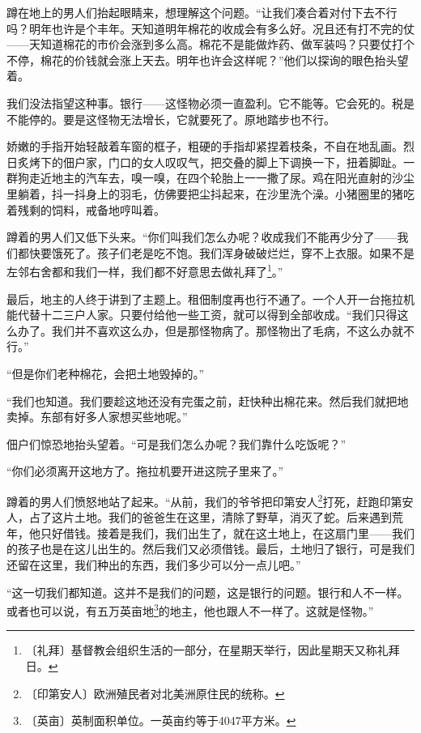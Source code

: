 \documentclass[12pt,UTF-8,openany]{ctexbook}
\begin{document}
\begin{normalsize}
    蹲在地上的男人们抬起眼睛来，想理解这个问题。“让我们凑合着对付下去不行吗？明年也许是个丰年。天知道明年棉花的收成会有多么好。况且还有打不完的仗——天知道棉花的市价会涨到多么高。棉花不是能做炸药、做军装吗？只要仗打个不停，棉花的价钱就会涨上天去。明年也许会这样呢？”他们以探询的眼色抬头望着。
    
    我们没法指望这种事。银行——这怪物必须一直盈利。它不能等。它会死的。税是不能停的。要是这怪物无法增长，它就要死了。原地踏步也不行。
    
    娇嫩的手指开始轻敲着车窗的框子，粗硬的手指却紧捏着枝条，不自在地乱画。烈日炙烤下的佃户家，门口的女人叹叹气，把交叠的脚上下调换一下，扭着脚趾。一群狗走近地主的汽车去，嗅一嗅，在四个轮胎上一一撒了尿。鸡在阳光直射的沙尘里躺着，抖一抖身上的羽毛，仿佛要把尘抖起来，在沙里洗个澡。小猪圈里的猪吃着残剩的饲料，戒备地哼叫着。
    
    蹲着的男人们又低下头来。“你们叫我们怎么办呢？收成我们不能再少分了——我们都快要饿死了。孩子们老是吃不饱。我们浑身破破烂烂，穿不上衣服。如果不是左邻右舍都和我们一样，我们都不好意思去做礼拜了\footnote{〔礼拜〕基督教会组织生活的一部分，在星期天举行，因此星期天又称礼拜日。}。”
    
    最后，地主的人终于讲到了主题上。租佃制度再也行不通了。一个人开一台拖拉机能代替十二三户人家。只要付给他一些工资，就可以得到全部收成。“我们只得这么办了。我们并不喜欢这么办，但是那怪物病了。那怪物出了毛病，不这么办就不行。”
    
    “但是你们老种棉花，会把土地毁掉的。”
    
    “我们也知道。我们要趁这地还没有完蛋之前，赶快种出棉花来。然后我们就把地卖掉。东部有好多人家想买些地呢。”
    
    佃户们惊恐地抬头望着。“可是我们怎么办呢？我们靠什么吃饭呢？”
    
    “你们必须离开这地方了。拖拉机要开进这院子里来了。”
    
    蹲着的男人们愤怒地站了起来。“从前，我们的爷爷把印第安人\footnote{〔印第安人〕欧洲殖民者对北美洲原住民的统称。}打死，赶跑印第安人，占了这片土地。我们的爸爸生在这里，清除了野草，消灭了蛇。后来遇到荒年，他只好借钱。接着是我们，我们出生了，就在这土地上，在这扇门里——我们的孩子也是在这儿出生的。然后我们又必须借钱。最后，土地归了银行，可是我们还留在这里，我们种出的东西，我们多少可以分一点儿吧。”
    
    “这一切我们都知道。这并不是我们的问题，这是银行的问题。银行和人不一样。或者也可以说，有五万英亩地\footnote{〔英亩〕英制面积单位。一英亩约等于4047平方米。}的地主，他也跟人不一样了。这就是怪物。”
    

\end{normalsize}
\end{document}
